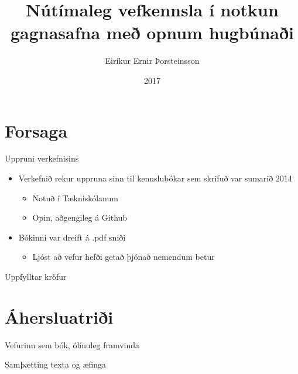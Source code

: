 \documentclass[hi-blar]{beamer}
\title{Nútímaleg vefkennsla í notkun gagnasafna með opnum hugbúnaði}
\author{Eiríkur Ernir Þorsteinsson}
\institute{Háskóli Íslands}
\date{2017}
\begin{document}
{
  \frame{\titlepage}
}


\frame{\tableofcontents}

\section{Forsaga}

\begin{frame}{Uppruni verkefnisins}
  \begin{itemize}
    \item Verkefnið rekur uppruna sinn til kennslubókar sem skrifuð var sumarið 2014
    \begin{itemize}
      \item Notuð í Tækniskólanum
      \item Opin, aðgengileg á Github
    \end{itemize}
    \item Bókinni var dreift á .pdf sniði
    \begin{itemize}
      \item Ljóst að vefur hefði getað þjónað nemendum betur
    \end{itemize}
  \end{itemize}
\end{frame}

\begin{frame}{Uppfylltar kröfur}

\end{frame}

\section{Áhersluatriði}

\begin{frame}{Vefurinn sem bók, ólínuleg framvinda}
  
\end{frame}

\begin{frame}{Samþætting texta og æfinga}
  
\end{frame}
\end{document}
